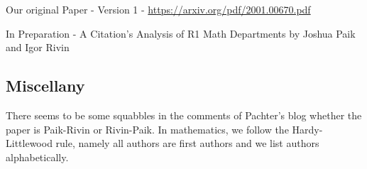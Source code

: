 \documentclass[]{article}
\begin{document}
Our original Paper - Version 1 -
\url{https://arxiv.org/pdf/2001.00670.pdf}

In Preparation - A Citation's Analysis of R1 Math Departments by Joshua
Paik and Igor Rivin

\hypertarget{miscellany}{%
\subsection{Miscellany}\label{miscellany}}

There seems to be some squabbles in the comments of Pachter's blog
whether the paper is Paik-Rivin or Rivin-Paik. In mathematics, we follow
the Hardy-Littlewood rule, namely all authors are first authors and we
list authors alphabetically.
\end{document}
